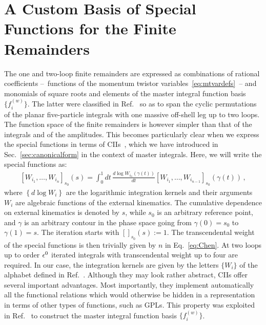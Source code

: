 \documentclass[main.tex]{subfiles}
\begin{document}
\section{A Custom Basis of Special Functions for the Finite Remainders}
\label{Hbbsec:Hbasis}
The one and two-loop finite remainders are expressed as combinations of rational coefficients --~functions of the momentum twistor variables~\eqref{eq:mtvardefs}~-- and monomials of square roots and elements of the master integral function basis $\{f^{(w)}_i\}$. The latter were classified in Ref.~\cite{Badger:2021nhg} so as to span the cyclic permutations of the planar five-particle integrals with one massive off-shell leg up to two loops. The function space of the finite remainders is however simpler than that of the integrals and of the amplitudes. This becomes particularly clear when we express the special functions in terms of CIIs~\cite{Chen:1977oja}, which we have introduced in Sec.~\ref{sec:canonicalform} in the context of master integrals. Here, we will write the special functions as:
\begin{align} \label{eq:Chen}
\left[W_{i_1}, \ldots, W_{i_n}  \right]_{s_0} (s) = \int_0^1 dt \, \frac{d \log W_{i_n}\left(\gamma(t)\right)}{dt} \left[W_{i_1}, \ldots, W_{i_{n-1}}  \right]_{s_0} \left(\gamma(t)\right) \,,
\end{align}
where $\left\{ d\log W_i \right\}$ are the logarithmic integration kernels and their arguments $W_i$ are algebraic functions of the external kinematics. The cumulative dependence on external kinematics is denoted by $s$, while $s_0$ is an arbitrary reference point, and $\gamma$ is an arbitrary contour in the phase space going from $\gamma(0)=s_0$ to $\gamma(1)=s$. The iteration starts with $[]_{s_0}(s) := 1$. The transcendental weight of the special functions is then trivially given by $n$ in Eq.~\eqref{eq:Chen}. At two loops up to order $\epsilon^0$ iterated integrals with transcendental weight up to four are required. In our case, the integration kernels are given by the letters $\{W_i\}$ of the alphabet defined in Ref.~\cite{Abreu:2020jxa}. 
Although they may look rather abstract, CIIs offer several important advantages. Most importantly, they implement automatically all the functional relations which would otherwise be hidden in a representation in terms of other types of functions, such as GPLs. This property was exploited in Ref.~\cite{Badger:2021nhg} to construct the master integral function basis $\{f^{(w)}_i\}$. 
\end{document}
